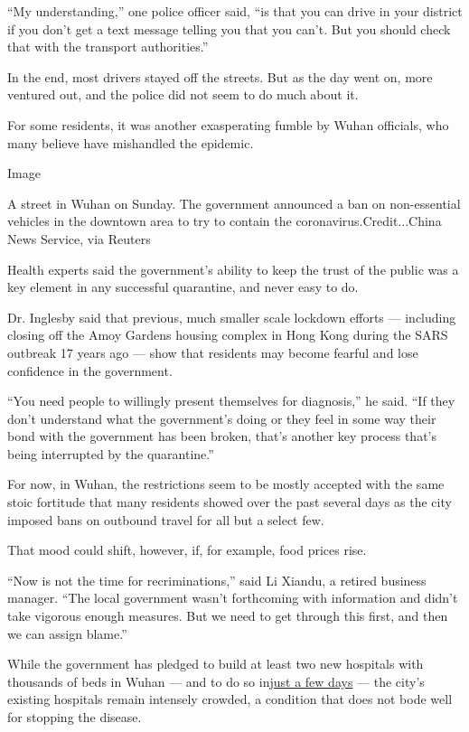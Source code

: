 ``My understanding,'' one police officer said, ``is that you can drive
in your district if you don't get a text message telling you that you
can't. But you should check that with the transport authorities.''

In the end, most drivers stayed off the streets. But as the day went on,
more ventured out, and the police did not seem to do much about it.

For some residents, it was another exasperating fumble by Wuhan
officials, who many believe have mishandled the epidemic.

Image

A street in Wuhan on Sunday. The government announced a ban on
non-essential vehicles in the downtown area to try to contain the
coronavirus.Credit...China News Service, via Reuters

Health experts said the government's ability to keep the trust of the
public was a key element in any successful quarantine, and never easy to
do.

Dr. Inglesby said that previous, much smaller scale lockdown efforts ---
including closing off the Amoy Gardens housing complex in Hong Kong
during the SARS outbreak 17 years ago --- show that residents may become
fearful and lose confidence in the government.

``You need people to willingly present themselves for diagnosis,'' he
said. ``If they don't understand what the government's doing or they
feel in some way their bond with the government has been broken, that's
another key process that's being interrupted by the quarantine.''

For now, in Wuhan, the restrictions seem to be mostly accepted with the
same stoic fortitude that many residents showed over the past several
days as the city imposed bans on outbound travel for all but a select
few.

That mood could shift, however, if, for example, food prices rise.

``Now is not the time for recriminations,'' said Li Xiandu, a retired
business manager. ``The local government wasn't forthcoming with
information and didn't take vigorous enough measures. But we need to get
through this first, and then we can assign blame.''

While the government has pledged to build at least two new hospitals
with thousands of beds in Wuhan --- and to do so
in\href{https://www.nytimes.com/2020/01/25/world/asia/china-coronavirus.html}{just
a few days} --- the city's existing hospitals remain intensely crowded,
a condition that does not bode well for stopping the disease.


